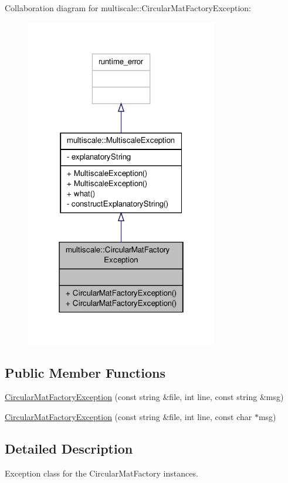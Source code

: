 Collaboration diagram for multiscale\-:\-:Circular\-Mat\-Factory\-Exception\-:
\nopagebreak
\begin{figure}[H]
\begin{center}
\leavevmode
\includegraphics[width=238pt]{classmultiscale_1_1CircularMatFactoryException__coll__graph}
\end{center}
\end{figure}
\subsection*{Public Member Functions}
\begin{DoxyCompactItemize}
\item 
\hyperlink{classmultiscale_1_1CircularMatFactoryException_af9876b3e4dc7681bf52e03ac5375957a}{Circular\-Mat\-Factory\-Exception} (const string \&file, int line, const string \&msg)
\item 
\hyperlink{classmultiscale_1_1CircularMatFactoryException_a213e2ed3c46f995f9fa20e5ac73cfdf3}{Circular\-Mat\-Factory\-Exception} (const string \&file, int line, const char $\ast$msg)
\end{DoxyCompactItemize}


\subsection{Detailed Description}
Exception class for the Circular\-Mat\-Factory instances. 

